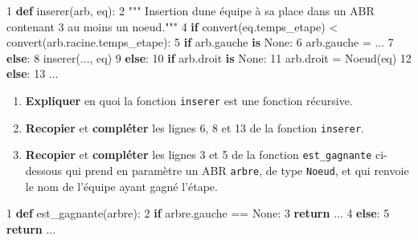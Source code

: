 \documentclass[
  paper=a4,
  ,captions=tableheading
]{scrartcl}
\newenvironment{Shaded}{}{}
\newcommand{\ControlFlowTok}[1]{\textcolor[rgb]{0.00,0.44,0.13}{\textbf{#1}}}
\newcommand{\DecValTok}[1]{\textcolor[rgb]{0.25,0.63,0.44}{#1}}
\newcommand{\KeywordTok}[1]{\textcolor[rgb]{0.00,0.44,0.13}{\textbf{#1}}}
\newcommand{\NormalTok}[1]{#1}
\newcommand{\OperatorTok}[1]{\textcolor[rgb]{0.40,0.40,0.40}{#1}}
\newcommand{\StringTok}[1]{\textcolor[rgb]{0.25,0.44,0.63}{#1}}
\newcommand{\VariableTok}[1]{\textcolor[rgb]{0.10,0.09,0.49}{#1}}
\begin{document}
\begin{Shaded}
\begin{Highlighting}[]
\DecValTok{1} \KeywordTok{def}\NormalTok{ inserer(arb, eq):}
\DecValTok{2}   \StringTok{""" Insertion d\textquotesingle{}une équipe à sa place dans un ABR contenant}
\StringTok{3   au moins un noeud."""}
\DecValTok{4}   \ControlFlowTok{if}\NormalTok{ convert(eq.temps\_etape) }\OperatorTok{\textless{}}\NormalTok{ convert(arb.racine.temps\_etape):}
\DecValTok{5}       \ControlFlowTok{if}\NormalTok{ arb.gauche }\KeywordTok{is} \VariableTok{None}\NormalTok{:}
\DecValTok{6}\NormalTok{           arb.gauche }\OperatorTok{=}\NormalTok{ ...}
\DecValTok{7}       \ControlFlowTok{else}\NormalTok{:}
\DecValTok{8}\NormalTok{           inserer(..., eq)}
\DecValTok{9}   \ControlFlowTok{else}\NormalTok{:}
\DecValTok{10}      \ControlFlowTok{if}\NormalTok{ arb.droit }\KeywordTok{is} \VariableTok{None}\NormalTok{:}
\DecValTok{11}\NormalTok{          arb.droit }\OperatorTok{=}\NormalTok{ Noeud(eq)}
\DecValTok{12}      \ControlFlowTok{else}\NormalTok{:}
\DecValTok{13}\NormalTok{          ...}
\end{Highlighting}
\end{Shaded}

\begin{enumerate}
\def\labelenumi{\arabic{enumi}.}
\setcounter{enumi}{9}
\item
  \textbf{Expliquer} en quoi la fonction \texttt{inserer} est une
  fonction récursive.
\item
  \textbf{Recopier} et \textbf{compléter} les lignes 6, 8 et 13 de la
  fonction \texttt{inserer}.
\item
  \textbf{Recopier} et \textbf{compléter} les lignes 3 et 5 de la
  fonction \texttt{est\_gagnante} ci-dessous qui prend en paramètre un
  ABR \texttt{arbre}, de type \texttt{Noeud}, et qui renvoie le nom de
  l'équipe ayant gagné l'étape.
\end{enumerate}

\begin{Shaded}
\begin{Highlighting}[]
\DecValTok{1} \KeywordTok{def}\NormalTok{ est\_gagnante(arbre):}
\DecValTok{2}     \ControlFlowTok{if}\NormalTok{ arbre.gauche }\OperatorTok{==} \VariableTok{None}\NormalTok{:}
\DecValTok{3}       \ControlFlowTok{return}\NormalTok{ ...}
\DecValTok{4}     \ControlFlowTok{else}\NormalTok{:}
\DecValTok{5}       \ControlFlowTok{return}\NormalTok{ ...}
\end{Highlighting}
\end{Shaded}
\end{document}
